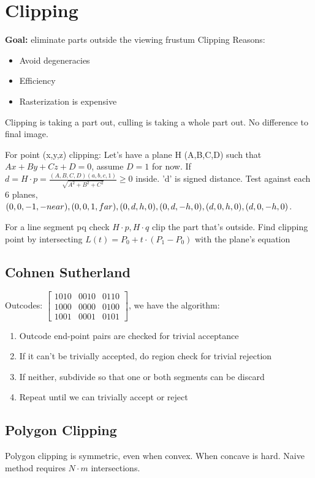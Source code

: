 \documentclass[a4paper]{article}
\begin{document}
\section{Clipping}
\textbf{Goal:} eliminate parts outside the viewing frustum
Clipping Reasons:
\begin{itemize}
	\item Avoid degeneracies
	\item Efficiency
	\item Rasterization is expensive
\end{itemize}
Clipping is taking a part out, culling is taking a whole part out. No difference to final image.

For point (x,y,z) clipping:
Let's have a plane H (A,B,C,D) such that $Ax + By + Cz + D = 0$, assume $D=1$ for now. If $d = H\cdot p = \frac{(A, B, C,D)(a, b, c, 1)}{\sqrt{A^2 + B^2 + C^2}} \geq 0$ inside. 'd' is signed distance.
 Test against each 6 planes, $(0, 0, -1, -near), (0, 0,1,far), (0,d,h,0), \\(0,d,-h,0),(d,0,h,0), (d, 0, -h, 0)$.

For a line segment pq check $H\cdot p, H\cdot q$ clip the part that's outside. Find clipping point by intersecting $L(t) = P_0 + t\cdot (P_1 - P_0)$ with the plane's equation

\subsection{Cohnen Sutherland}
Outcodes:
$\left[\begin{smallmatrix} 1010 & 0010 & 0110 \\ 1000 & 0000 & 0100 \\ 1001 & 0001 & 0101 \end{smallmatrix} \right] $, we have the algorithm:
\begin{enumerate}
	\item Outcode end-point pairs are checked for trivial acceptance
	\item If it can't be trivially accepted, do region check for trivial rejection
	\item If neither, subdivide so that one or both segments can be discard
	\item Repeat until we can trivially accept or reject
\end{enumerate}

\subsection{Polygon Clipping}
Polygon clipping is symmetric, even when convex. When concave is hard. Naive method requires $N\cdot m$ intersections. 
\end{document}

